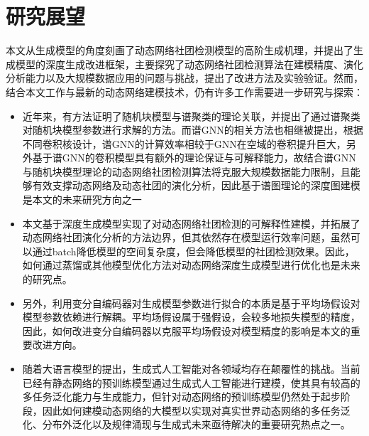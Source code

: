 \section{研究展望}

本文从生成模型的角度刻画了动态网络社团检测模型的高阶生成机理，并提出了生成模型的深度生成改进框架，主要探究了动态网络社团检测算法在建模精度、演化分析能力以及大规模数据应用的问题与挑战，提出了改进方法及实验验证。然而，结合本文工作与最新的动态网络建模技术，仍有许多工作需要进一步研究与探索：

\begin{itemize}
	\item 近年来，有方法证明了随机块模型与谱聚类的理论关联\cite{keriven2022sparse}，并提出了通过谱聚类对随机块模型参数进行求解的方法。而谱GNN\cite{wang2022powerful}的相关方法也相继被提出，根据不同卷积核设计，谱GNN的计算效率相较于GNN在空域的卷积提升巨大，另外基于谱GNN的卷积模型具有额外的理论保证与可解释能力，故结合谱GNN与随机块模型理论的动态网络社团检测算法将克服大规模数据能力限制，且能够有效支撑动态网络及动态社团的演化分析，因此基于谱图理论的深度图建模是本文的未来研究方向之一
	\item 本文基于深度生成模型实现了对动态网络社团检测的可解释性建模，并拓展了动态网络社团演化分析的方法边界，但其依然存在模型运行效率问题，虽然可以通过batch降低模型的空间复杂度，但会降低模型的社团检测效果。因此，如何通过蒸馏或其他模型优化方法对动态网络深度生成模型进行优化也是未来的研究点。
	\item 另外，利用变分自编码器对生成模型参数进行拟合的本质是基于平均场假设对模型参数依赖进行解耦。平均场假设属于强假设，会较多地损失模型的精度，因此，如何改进变分自编码器以克服平均场假设对模型精度的影响是本文的重要改进方向。
    \item 随着大语言模型的提出，生成式人工智能对各领域均存在颠覆性的挑战。当前已经有静态网络的预训练模型通过生成式人工智能进行建模，使其具有较高的多任务泛化能力与生成能力，但针对动态网络的预训练模型仍然处于起步阶段，因此如何建模动态网络的大模型以实现对真实世界动态网络的多任务泛化、分布外泛化以及规律涌现与生成式未来亟待解决的重要研究热点之一。
\end{itemize}




